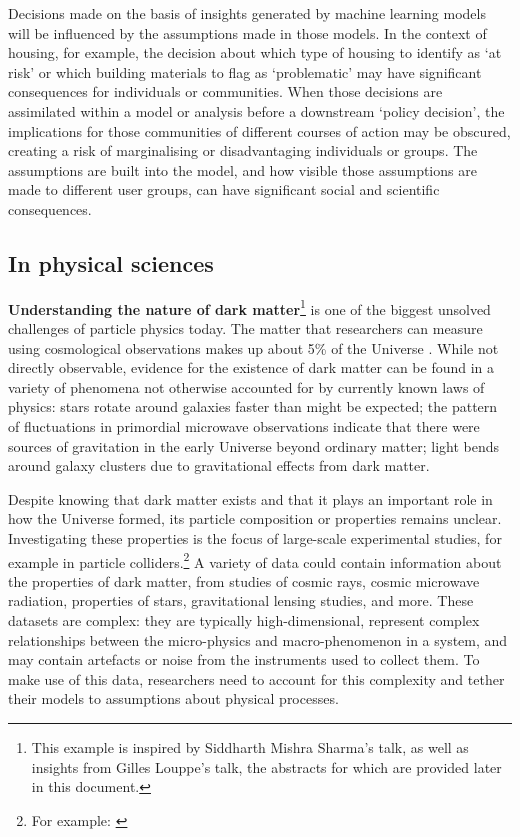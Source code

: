 Decisions made on the basis of insights generated by machine learning
models will be influenced by the assumptions made in those models. In
the context of housing, for example, the decision about which type of
housing to identify as `at risk' or which building materials to flag as
`problematic' may have significant consequences for individuals or
communities. When those decisions are assimilated within a model or
analysis before a downstream `policy decision', the implications for
those communities of different courses of action may be obscured,
creating a risk of marginalising or disadvantaging individuals or
groups. The assumptions are built into the model, and how visible those
assumptions are made to different user groups, can have significant
social and scientific consequences.

\subsection{In physical sciences}\label{in-physical-sciences}

\noindent\textbf{Understanding the nature of dark matter}\footnote{This example
  is inspired by Siddharth Mishra Sharma's talk, as well as insights
  from Gilles Louppe's talk, the abstracts for which are provided later
  in this document.} is one of the biggest unsolved challenges of
particle physics today. The matter that researchers can measure using
cosmological observations makes up about 5\% of the Universe \cite{NASA-dark}.
While not directly observable, evidence for the existence of dark matter
can be found in a variety of phenomena not otherwise accounted for by
currently known laws of physics: stars rotate around galaxies faster
than might be expected; the pattern of fluctuations in primordial
microwave observations indicate that there were sources of gravitation
in the early Universe beyond ordinary matter; light bends around galaxy
clusters due to gravitational effects from dark matter.

Despite knowing that dark matter exists and that it plays an important
role in how the Universe formed, its particle composition or properties
remains unclear. Investigating these properties is the focus of
large-scale experimental studies, for example in particle
colliders.\footnote{For example: \cite{ATLAS-experiment08}} A variety of data could
contain information about the properties of dark matter, from studies of
cosmic rays, cosmic microwave radiation, properties of stars,
gravitational lensing studies, and more. These datasets are complex:
they are typically high-dimensional, represent complex relationships
between the micro-physics and macro-phenomenon in a system, and may
contain artefacts or noise from the instruments used to collect them. To
make use of this data, researchers need to account for this complexity
and tether their models to assumptions about physical processes.

